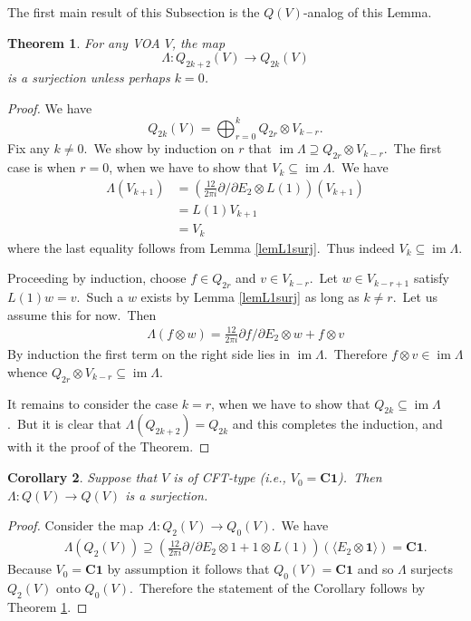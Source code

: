 \documentclass[12pt]{amsart}
\theoremstyle{plain}
\newtheorem{thm}{Theorem}[section]
\newtheorem{cor}[thm]{Corollary}
\theoremstyle{definition}
\theoremstyle{remark}
\DeclareMathOperator{\im}{im}
\newcommand{\CC}{\mathbf{C}}
\begin{document}
The first main result of this Subsection is the $Q(V)$-analog of this Lemma.
\begin{thm}\label{thmalmostonto} For any VOA $V$, the map
$$\Lambda: Q_{2k+2}(V)\rightarrow Q_{2k}(V)$$
is a surjection unless perhaps $k=0$.
\end{thm}
\begin{proof} We have
$$Q_{2k}(V)=\bigoplus_{r=0}^k Q_{2r}\otimes V_{k-r}.$$
Fix any $k\neq 0$.\ We show by induction on $r$ that $\im\Lambda\supseteq Q_{2r}\otimes V_{k-r}$.\ The first case is when $r=0$, when we have to show that $V_k\subseteq\im\Lambda$.\ We have
\begin{align*}
\Lambda(V_{k+1})&=\left(\frac{12}{2\pi i}\partial/\partial E_2\otimes L(1)\right)(V_{k+1})\\
&=L(1)V_{k+1}\\
&=V_k
    \end{align*}
    where the last equality follows from Lemma \ref{lemL1surj}.\ Thus indeed
    $V_k\subseteq \im\Lambda$.

\medskip
    Proceeding by induction, choose $f\in Q_{2r}$ and $v\in V_{k-r}$.\ Let $w\in V_{k-r+1}$ satisfy $L(1)w=v$.\ Such a $w$ exists by Lemma \ref{lemL1surj} as long as  $k\neq r$.\ Let us assume this for now.\ Then
    \begin{eqnarray*}
     &&\Lambda(f\otimes w)=\frac{12}{2\pi i}\partial f/\partial E_2\otimes w+ f\otimes v 
    \end{eqnarray*}
    By induction the first term on the right side lies in $\im\Lambda$.\ Therefore $f\otimes v\in\im\Lambda$ whence
    $Q_{2r}\otimes V_{k-r}\subseteq\im\Lambda$.

    \medskip
    It remains to consider the case $k=r$, when we have to show that $Q_{2k}\subseteq\im\Lambda$.\ But it is clear that $\Lambda(Q_{2k+2})=Q_{2k}$ and this completes the induction, and with it the proof of the Theorem.
\end{proof}


\begin{cor} 
Suppose that $V$ is of CFT-type (i.e., $V_0=\CC\mathbf{1}$).\ Then $\Lambda: Q(V)\rightarrow Q(V)$ is a surjection.
\end{cor}
\begin{proof}Consider the map $\Lambda:Q_2(V)\rightarrow Q_0(V)$.\ We have
\begin{eqnarray*}
&&\Lambda(Q_2(V))\supseteq \left(\frac{12}{2\pi i}\partial/\partial E_2\otimes 1+1\otimes L(1) \right) (\langle E_2\otimes \mathbf{1}\rangle)   =\CC\mathbf{1}.
\end{eqnarray*}
Because $V_0=\CC\mathbf{1}$ by assumption it follows that
$Q_0(V)=\CC\mathbf{1}$ and so $\Lambda$ surjects $Q_2(V)$ onto $Q_0(V)$.\ Therefore the statement of the Corollary follows by Theorem \ref{thmalmostonto}.
\end{proof}
\end{document}
